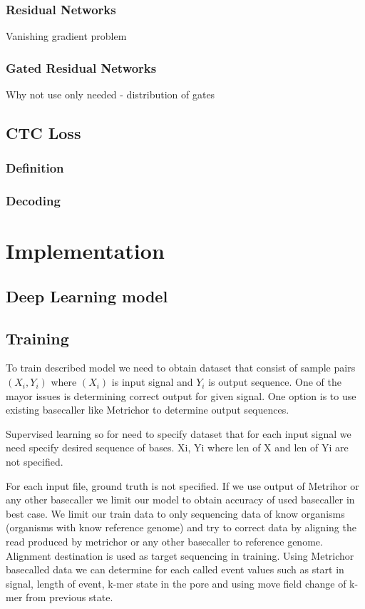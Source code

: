 \documentclass[times, utf8, diplomski, numeric, english]{fer}
\begin{document}
\subsection{Residual Networks}
Vanishing gradient problem
\subsection{Gated Residual Networks}
Why not use only needed - distribution of gates

\section{CTC Loss}
\subsection{Definition}
\subsection{Decoding}


\chapter{Implementation}
\section{Deep Learning model}
\section{Training}

To train described model we need to obtain dataset that consist of sample pairs $(X_i, Y_i)$ where $(X_i)$ is input signal and $Y_i$ is output sequence. 
One of the mayor issues is determining correct output for given signal. One option is to use existing basecaller like Metrichor to determine output sequences. 

 




Supervised learning so for need to specify dataset that for each input signal we need specify desired sequence of bases.
{Xi, Yi} where len of X and len of Yi are not specified.

For each input file, ground truth is not specified. If we use output of Metrihor or any other basecaller we limit our model to
obtain accuracy of used basecaller in best case. We limit our train data to only sequencing data of know organisms (organisms with know reference genome) and try to correct data by aligning the read produced by metrichor or any other basecaller to reference genome. Alignment destination is used as target sequencing in training. 
Using Metrichor basecalled data we can determine for each called event values such as start in signal, length of event, k-mer state in the pore and using move field change of k-mer from previous state. 
\end{document}
